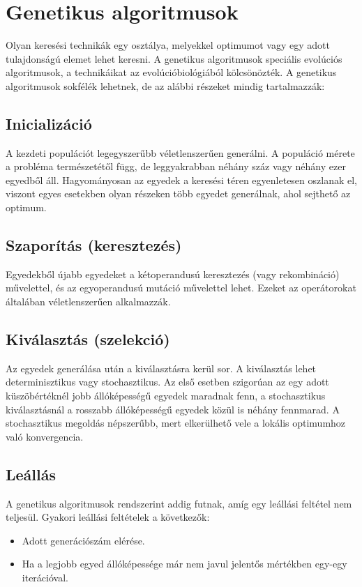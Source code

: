 \section{Genetikus algoritmusok}

Olyan keresési technikák egy osztálya, melyekkel optimumot vagy egy adott tulajdonságú elemet lehet keresni. A genetikus algoritmusok speciális evolúciós algoritmusok, a technikáikat az evolúcióbiológiából kölcsönözték. 
A genetikus algoritmusok sokfélék lehetnek, de az alábbi részeket mindig tartalmazzák: 

\subsection{Inicializáció}
A kezdeti populációt legegyszerűbb véletlenszerűen generálni. A populáció mérete a probléma természetétől függ, de leggyakrabban néhány száz vagy néhány ezer egyedből áll. Hagyományosan az egyedek a keresési téren egyenletesen oszlanak el, viszont egyes esetekben olyan részeken több egyedet generálnak, ahol sejthető az optimum. 

\subsection{Szaporítás (keresztezés)}
Egyedekből újabb egyedeket a kétoperandusú keresztezés (vagy rekombináció) művelettel, és az egyoperandusú mutáció művelettel lehet. Ezeket az operátorokat általában véletlenszerűen alkalmazzák. 

\subsection{Kiválasztás (szelekció)}
Az egyedek generálása után a kiválasztásra kerül sor. A kiválasztás lehet determinisztikus vagy stochasztikus. Az első esetben szigorúan az egy adott küszöbértéknél jobb állóképességű egyedek maradnak fenn, a stochasztikus kiválasztásnál a rosszabb állóképességű egyedek közül is néhány fennmarad. A stochasztikus megoldás népszerűbb, mert elkerülhető vele a lokális optimumhoz való konvergencia.

\subsection{Leállás}
A genetikus algoritmusok rendszerint addig futnak, amíg egy leállási feltétel nem teljesül. Gyakori leállási feltételek a következők: 

\begin{itemize}
	\item{Adott generációszám elérése.}
	\item{Ha a legjobb egyed állóképessége már nem javul jelentős mértékben egy-egy iterációval. }
\end{itemize}